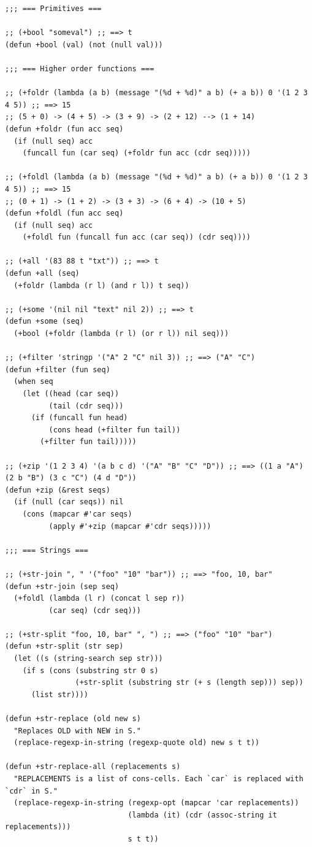 \documentclass[11pt]{article}
\begin{document}
\begin{verbatim}
;;; === Primitives ===

;; (+bool "someval") ;; ==> t
(defun +bool (val) (not (null val)))

;;; === Higher order functions ===

;; (+foldr (lambda (a b) (message "(%d + %d)" a b) (+ a b)) 0 '(1 2 3 4 5)) ;; ==> 15
;; (5 + 0) -> (4 + 5) -> (3 + 9) -> (2 + 12) --> (1 + 14)
(defun +foldr (fun acc seq)
  (if (null seq) acc
    (funcall fun (car seq) (+foldr fun acc (cdr seq)))))

;; (+foldl (lambda (a b) (message "(%d + %d)" a b) (+ a b)) 0 '(1 2 3 4 5)) ;; ==> 15
;; (0 + 1) -> (1 + 2) -> (3 + 3) -> (6 + 4) -> (10 + 5)
(defun +foldl (fun acc seq)
  (if (null seq) acc
    (+foldl fun (funcall fun acc (car seq)) (cdr seq))))

;; (+all '(83 88 t "txt")) ;; ==> t
(defun +all (seq)
  (+foldr (lambda (r l) (and r l)) t seq))

;; (+some '(nil nil "text" nil 2)) ;; ==> t
(defun +some (seq)
  (+bool (+foldr (lambda (r l) (or r l)) nil seq)))

;; (+filter 'stringp '("A" 2 "C" nil 3)) ;; ==> ("A" "C")
(defun +filter (fun seq)
  (when seq
    (let ((head (car seq))
          (tail (cdr seq)))
      (if (funcall fun head)
          (cons head (+filter fun tail))
        (+filter fun tail)))))

;; (+zip '(1 2 3 4) '(a b c d) '("A" "B" "C" "D")) ;; ==> ((1 a "A") (2 b "B") (3 c "C") (4 d "D"))
(defun +zip (&rest seqs)
  (if (null (car seqs)) nil
    (cons (mapcar #'car seqs)
          (apply #'+zip (mapcar #'cdr seqs)))))

;;; === Strings ===

;; (+str-join ", " '("foo" "10" "bar")) ;; ==> "foo, 10, bar"
(defun +str-join (sep seq)
  (+foldl (lambda (l r) (concat l sep r))
          (car seq) (cdr seq)))

;; (+str-split "foo, 10, bar" ", ") ;; ==> ("foo" "10" "bar")
(defun +str-split (str sep)
  (let ((s (string-search sep str)))
    (if s (cons (substring str 0 s)
                (+str-split (substring str (+ s (length sep))) sep))
      (list str))))

(defun +str-replace (old new s)
  "Replaces OLD with NEW in S."
  (replace-regexp-in-string (regexp-quote old) new s t t))

(defun +str-replace-all (replacements s)
  "REPLACEMENTS is a list of cons-cells. Each `car` is replaced with `cdr` in S."
  (replace-regexp-in-string (regexp-opt (mapcar 'car replacements))
                            (lambda (it) (cdr (assoc-string it replacements)))
                            s t t))


\end{verbatim}
\end{document}

